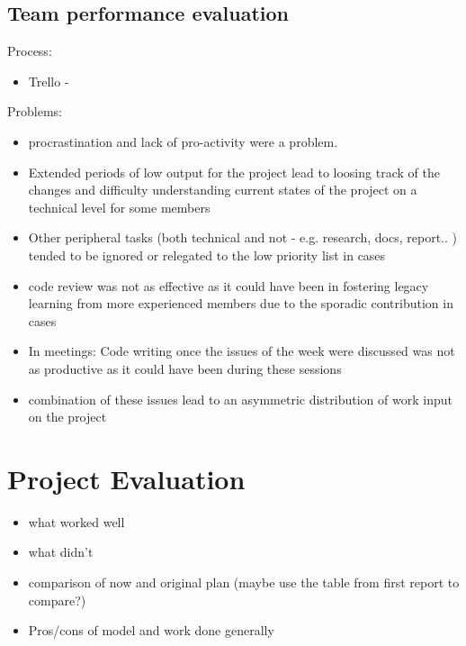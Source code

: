 \subsection{Team performance evaluation}

Process:
\begin{itemize}
	\item Trello - 
\end{itemize}


Problems:
\begin{itemize}
    \item procrastination and lack of pro-activity were a problem.
    \item Extended periods of low output for the project lead to loosing track of the changes and difficulty understanding current states of the project on a technical level for some members
    \item Other peripheral tasks (both technical and not - e.g. research, docs, report.. ) tended to be ignored or relegated to the low priority list in cases
    \item code review was not as effective as it could have been in fostering legacy learning from more experienced members due to the sporadic contribution in cases
    \item In meetings: Code writing once the issues of the week were discussed was not as productive as it could have been during these sessions
    \item combination of these issues lead to an asymmetric distribution of work input on the project
\end{itemize}


\section{Project Evaluation}

\begin{itemize}
	\item what worked well
	\item what didn't
	\item comparison of now and original plan (maybe use the table from first report to compare?)
	\item Pros/cons of model and work done generally
\end{itemize}


